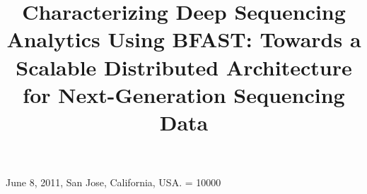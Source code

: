 \documentclass{sig-alternate}
\begin{document}
 {June 8, 2011, San Jose, California, USA.}
\widowpenalty = 10000



\newif\ifdraft

\ifdraft
 \newcommand{\jkimnote}[1]{{\textcolor{green}   { ***Joohyun:   #1 }}}
 \newcommand{\jhanote}[1]{  {\textcolor{red}     { ***SJ: #1 }}}
  \newcommand{\smnote}[1]{  {\textcolor{red}     { ***Sharath: #1 }}}
 \newcommand{\todo}[1]{  {\textcolor{red}     { ***TODO: #1 }}}
 \newcommand{\fix}[1]{  {\textcolor{red}     { ***FIX: #1 }}}
 \newcommand{\reviewer}[1]{}
\else
 \newcommand{\reviewer}[1]{}
 \newcommand{\jkimnote}[1]{}
 \newcommand{\smnote}[1]{}
 \newcommand{\jhanote}[1]{}
 \newcommand{\todo}[1]{  {\textcolor{red}     { ***TODO: #1 }}}
 \newcommand{\fix}[1]{}                                                                                     
\fi

\title{Characterizing Deep Sequencing Analytics Using BFAST: Towards a
  Scalable Distributed Architecture for Next-Generation Sequencing
  Data}


%
%
%
%
%
\end{document}
